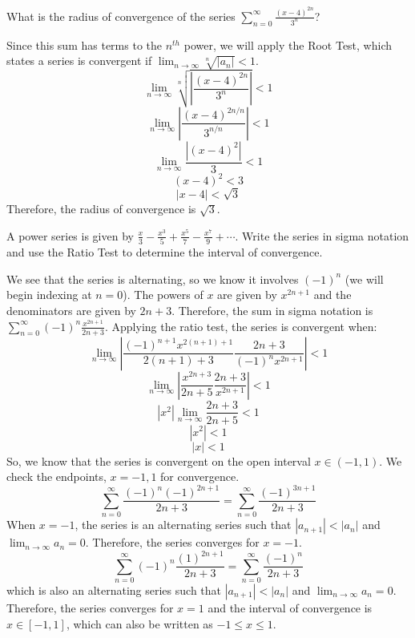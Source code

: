 \begin{Exercise} What is the radius of convergence 
of the series $\sum_{n=0}^\infty \frac{(x - 4)^{2n}}{3^n}$?
\end{Exercise}

\begin{Answer}[ref = radconv1]
Since this sum has terms to the $n^{th}$ power, we will apply the Root Test, 
which states a series is convergent if $\lim_{n \to \infty} \sqrt[n]{\left| 
a_n \right|} < 1$. 
$$\lim_{n \to \infty} \sqrt[n]{\left| \frac{(x - 4)^{2n}}{3^n} \right|} < 1$$
$$\lim_{n \to \infty} \left| \frac{(x - 4) ^ {2n/n}}{3^{n/n}} \right| < 1$$
$$\lim_{n \to \infty} \frac{\left| (x-4)^2 \right|}{3} < 1$$
$$(x - 4)^2 < 3$$
$$\left| x - 4 \right| < \sqrt{3}$$
Therefore, the radius of convergence is $\sqrt{3}$. 
\end{Answer}

\begin{Exercise} A power series is given by 
$\frac{x}{3} - \frac{x^3}{5} + \frac{x^5}{7} - \frac{x^7}{9} + \cdots$. Write 
the series in sigma notation and use the Ratio Test to determine the interval 
of convergence.
\end{Exercise}

\begin{Answer}[ref = radconv2]
We see that the series is alternating, so we know it involves $(-1)^n$ (we 
will begin indexing at $n = 0$). The powers of $x$ are given by $x^{2n+1}$ and 
the denominators are given by $2n + 3$. Therefore, the sum in sigma notation 
is $\sum_{n=0}^\infty (-1)^n \frac{x^{2n+1}}{2n+3}$. Applying the ratio test, 
the series is convergent when:
$$\lim_{n \to \infty} \left| \frac{(-1)^{n+1} x^{2(n+1)+1}}{2(n+1)+3} \frac{2n+
3}{(-1)^n x^{2n+1}} \right| < 1$$
$$\lim_{n \to \infty} \left| \frac{x^{2n+3}}{2n+5} \frac{2n+3}{x^{2n+1}} 
\right| < 1$$
$$\left| x^2 \right| \lim_{n \to \infty} \frac{2n+3}{2n+5} < 1$$
$$\left| x^2 \right| < 1$$
$$\left| x \right| < 1$$
So, we know that the series is convergent on the open interval $x \in (-1, 1)$. 
We check the endpoints, $x = -1, 1$ for convergence. 
$$\sum_{n=0}^\infty \frac{(-1)^n (-1)^{2n+1}}{2n+3} = \sum_{n=0}^\infty \frac{
(-1)^{3n+1}}{2n+3}$$
When $x = -1$, the series is an alternating series such that $\left| a_{n+1} 
\right| < \left|a_n \right|$ and $\lim_{n \to \infty} a_n = 0$. Therefore, the 
series converges for $x = -1$.
$$\sum_{n=0}^\infty (-1)^n \frac{(1)^{2n+1}}{2n+3} = \sum_{n=0}^\infty \frac{
(-1)^n}{2n+3}$$
which is also an alternating series such that $\left| a_{n+1} \right| < \left| 
a_n \right|$ and $\lim_{n \to \infty} a_n = 0$. Therefore, the series 
converges for $x = 1$ and the interval of convergence is $x \in [-1, 1]$, 
which can also be written as $-1 \leq x \leq 1$. 
\end{Answer}

